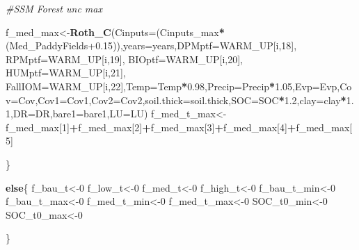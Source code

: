 \documentclass[
  10pt,
  b5paper,
]{book}
\newenvironment{Shaded}{\begin{snugshade}}{\end{snugshade}}
\newcommand{\CommentTok}[1]{\textcolor[rgb]{0.56,0.35,0.01}{\textit{#1}}}
\newcommand{\ControlFlowTok}[1]{\textcolor[rgb]{0.13,0.29,0.53}{\textbf{#1}}}
\newcommand{\DataTypeTok}[1]{\textcolor[rgb]{0.13,0.29,0.53}{#1}}
\newcommand{\DecValTok}[1]{\textcolor[rgb]{0.00,0.00,0.81}{#1}}
\newcommand{\FloatTok}[1]{\textcolor[rgb]{0.00,0.00,0.81}{#1}}
\newcommand{\KeywordTok}[1]{\textcolor[rgb]{0.13,0.29,0.53}{\textbf{#1}}}
\newcommand{\NormalTok}[1]{#1}
\newcommand{\OperatorTok}[1]{\textcolor[rgb]{0.81,0.36,0.00}{\textbf{#1}}}
\begin{document}
\begin{Shaded}
\begin{Highlighting}[]
\CommentTok{#SSM Forest unc max}

\NormalTok{f_med_max<-}\KeywordTok{Roth_C}\NormalTok{(}\DataTypeTok{Cinputs=}\NormalTok{(Cinputs_max}\OperatorTok{*}\NormalTok{(Med_PaddyFields}\FloatTok{+0.15}\NormalTok{)),}\DataTypeTok{years=}\NormalTok{years,}\DataTypeTok{DPMptf=}\NormalTok{WARM_UP[i,}\DecValTok{18}\NormalTok{], }\DataTypeTok{RPMptf=}\NormalTok{WARM_UP[i,}\DecValTok{19}\NormalTok{], }\DataTypeTok{BIOptf=}\NormalTok{WARM_UP[i,}\DecValTok{20}\NormalTok{], }\DataTypeTok{HUMptf=}\NormalTok{WARM_UP[i,}\DecValTok{21}\NormalTok{], }\DataTypeTok{FallIOM=}\NormalTok{WARM_UP[i,}\DecValTok{22}\NormalTok{],}\DataTypeTok{Temp=}\NormalTok{Temp}\OperatorTok{*}\FloatTok{0.98}\NormalTok{,}\DataTypeTok{Precip=}\NormalTok{Precip}\OperatorTok{*}\FloatTok{1.05}\NormalTok{,}\DataTypeTok{Evp=}\NormalTok{Evp,}\DataTypeTok{Cov=}\NormalTok{Cov,}\DataTypeTok{Cov1=}\NormalTok{Cov1,}\DataTypeTok{Cov2=}\NormalTok{Cov2,}\DataTypeTok{soil.thick=}\NormalTok{soil.thick,}\DataTypeTok{SOC=}\NormalTok{SOC}\OperatorTok{*}\FloatTok{1.2}\NormalTok{,}\DataTypeTok{clay=}\NormalTok{clay}\OperatorTok{*}\FloatTok{1.1}\NormalTok{,}\DataTypeTok{DR=}\NormalTok{DR,}\DataTypeTok{bare1=}\NormalTok{bare1,}\DataTypeTok{LU=}\NormalTok{LU)}
\NormalTok{f_med_t_max<-f_med_max[}\DecValTok{1}\NormalTok{]}\OperatorTok{+}\NormalTok{f_med_max[}\DecValTok{2}\NormalTok{]}\OperatorTok{+}\NormalTok{f_med_max[}\DecValTok{3}\NormalTok{]}\OperatorTok{+}\NormalTok{f_med_max[}\DecValTok{4}\NormalTok{]}\OperatorTok{+}\NormalTok{f_med_max[}\DecValTok{5}\NormalTok{]}

\NormalTok{\}}

\ControlFlowTok{else}\NormalTok{\{}
\NormalTok{f_bau_t<-}\DecValTok{0}
\NormalTok{f_low_t<-}\DecValTok{0}
\NormalTok{f_med_t<-}\DecValTok{0}
\NormalTok{f_high_t<-}\DecValTok{0}
\NormalTok{f_bau_t_min<-}\DecValTok{0}
\NormalTok{f_bau_t_max<-}\DecValTok{0}
\NormalTok{f_med_t_min<-}\DecValTok{0}
\NormalTok{f_med_t_max<-}\DecValTok{0}
\NormalTok{SOC_t0_min<-}\DecValTok{0}
\NormalTok{SOC_t0_max<-}\DecValTok{0}

\NormalTok{\}}



\end{Highlighting}
\end{Shaded}
\end{document}
